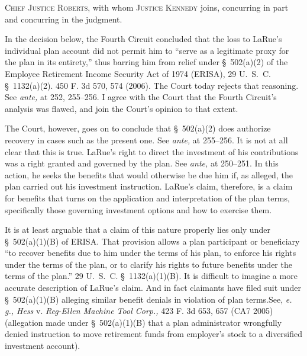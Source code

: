 
\setcounter{page}{257}

  \textsc{Chief Justice Roberts,} with whom \textsc{Justice Kennedy} joins, concurring in part and concurring in the judgment.

  In the decision below, the Fourth Circuit concluded that the loss to LaRue's individual plan account did not permit him to ``serve as a legitimate proxy for the plan in its entirety,'' thus barring him from relief under \S~502(a)(2) of the Employee Retirement Income Security Act of 1974 (ERISA), 29 U.~S.~C. \S~1132(a)(2). 450 F. 3d 570, 574 (2006). The Court today rejects that reasoning. See \emph{ante,} at 252, 255--256. I agree with the Court that the Fourth Circuit's analysis was flawed, and join the Court's opinion to that extent.

  The Court, however, goes on to conclude that \S~502(a)(2) does authorize recovery in cases such as the present one. See \emph{ante,} at 255--256. It is not at all clear that this is true. LaRue's right to direct the investment of his contributions was a right granted and governed by the plan. See \emph{ante,} at 250--251. In this action, he seeks the benefits that would otherwise be due him if, as alleged, the plan carried out his investment instruction. LaRue's claim, therefore, is a claim for benefits that turns on the application and interpretation of the plan terms, specifically those governing investment options and how to exercise them.

  It is at least arguable that a claim of this nature properly lies only under \S~502(a)(1)(B) of ERISA. That provision allows a plan participant or beneficiary ``to recover benefits due to him under the terms of his plan, to enforce his rights under the terms of the plan, or to clarify his rights to future benefits under the terms of the plan.'' 29 U.~S.~C. \S~1132(a)(1)(B). It is difficult to imagine a more accurate description of LaRue's claim. And in fact claimants have filed suit under \S~502(a)(1)(B) alleging similar benefit denials in violation of plan terms.See, \emph{e. g., Hess} v. \emph{Reg-Ellen Machine Tool Corp.,} 423 F. 3d 653, 657 (CA7 2005) (allegation made under \S~502(a)(1)(B) that a plan administrator wrong\newpage fully denied instruction to move retirement funds from employer's stock to a diversified investment account).

